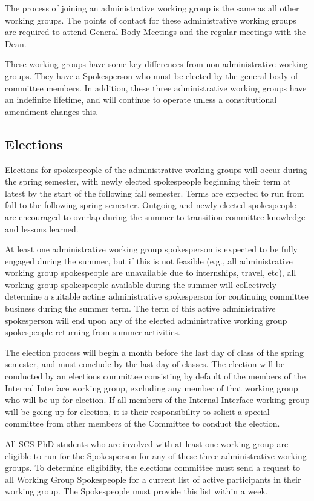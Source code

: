 \documentclass{article}
\begin{document}
The process of joining an administrative working group is the same as all other working groups. The points of contact for these administrative working groups are required to attend General Body Meetings and the regular meetings with the Dean.

These working groups have some key differences from non-administrative working groups. They have a Spokesperson who must be elected by the general body of committee members. In addition, these three administrative working groups have an indefinite lifetime, and will continue to operate unless a constitutional amendment changes this. 

\subsection{Elections}\label{sec:elections}

Elections for spokespeople of the administrative working groups will occur during the spring semester, with newly elected spokespeople beginning their term at latest by the start of the following fall semester.
Terms are expected to run from fall to the following spring semester.
Outgoing and newly elected spokespeople are encouraged to overlap during the summer to transition committee knowledge and lessons learned.

At least one administrative working group spokesperson is expected to be fully engaged during the summer, but if this is not feasible (e.g., all administrative working group spokespeople are unavailable due to internships, travel, etc), all working group spokespeople available during the summer will collectively determine a suitable acting administrative spokesperson for continuing committee business during the summer term.
The term of this active administrative spokesperson will end upon any of the elected administrative working group spokespeople returning from summer activities.

The election process will begin a month before the last day of class of the spring semester, and must conclude by the last day of classes.
The election will be conducted by an elections committee consisting by default of the members of the Internal Interface working group, excluding any member of that working group who will be up for election.
If all members of the Internal Interface working group will be going up for election, it is their responsibility to solicit a special committee from other members of the Committee to conduct the election.

All SCS PhD students who are involved with at least one working group are eligible to run for the Spokesperson for any of these three administrative working groups. To determine eligibility, the elections committee must send a request to all Working Group Spokespeople for a current list of active participants in their working group. The Spokespeople must provide this list within a week.
\end{document}

